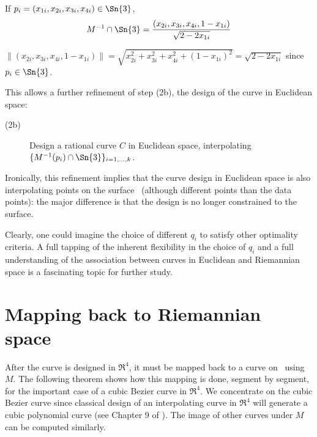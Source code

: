 \begin{lemma}
If $p_i = (x_{1i}, x_{2i}, x_{3i}, x_{4i}) \in \Sn{3}$, 
\[
	M^{-1} \cap \Sn{3} 
	= \frac{(x_{2i}, x_{3i}, x_{4i}, 1 - x_{1i})}{\sqrt{2-2x_{1i}}}
\]
\end{lemma}
\prf
$\| (x_{2i}, x_{3i}, x_{4i}, 1 - x_{1i}) \|
 = \sqrt{x_{2i}^2 + x_{3i}^2 + x_{4i}^2 + (1 - x_{1i})^2}
 = \sqrt{2-2x_{1i}}$
since $p_i \in \Sn{3}$.
\QED

\noindent This allows a further refinement of step (2b), the design of the
curve in Euclidean space:
%
\begin{description}
\item[(2b)]
	Design a rational curve $C$ in Euclidean space,
	interpolating $\{M^{-1}(p_i) \cap \Sn{3}\}_{i=1,\ldots,k}$.
\end{description}

Ironically, this refinement implies
that the curve design in Euclidean space is also interpolating points 
on the surface \ (although different points than the data points):
the major difference is that the design is no longer constrained
to the surface.

Clearly, one could imagine the choice of different $q_i$ to satisfy other
optimality criteria.
A full tapping of the inherent flexibility in the choice of $q_i$
and a full understanding of the association between curves in Euclidean
and Riemannian space is a fascinating topic for further study.

\section{Mapping back to Riemannian space}
\label{sec:curveimage}

After the curve is designed in $\Re^4$, it must be mapped back to a curve
on \ using $M$.
The following theorem shows how this mapping is done, segment by segment,
for the important case of a cubic Bezier curve in $\Re^4$.
We concentrate on the cubic Bezier curve since classical design of an 
interpolating curve in $\Re^4$ will generate
a cubic polynomial curve (see Chapter 9 of \cite{farin97}).
The image of other curves under $M$ can be computed similarly.

